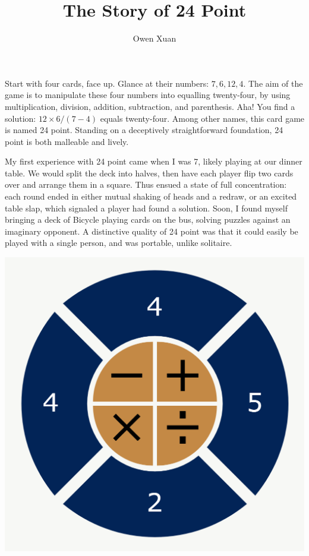 \documentclass{article}
\title{The Story of 24 Point}
\author{Owen Xuan}
\begin{document}
\maketitle
Start with four cards, face up. Glance at their numbers: $7, 6, 12, 4$. The aim of the game is to manipulate these four numbers into equalling twenty-four, by using multiplication, division, addition, subtraction, and parenthesis. Aha! You find a solution:  $12 \times 6 / (7-4)$ equals twenty-four. Among other names, this card game is named 24 point. Standing on a deceptively straightforward foundation, 24 point is both malleable and lively. 

My first experience with 24 point came when I was 7, likely playing at our dinner table. We would split the deck into halves, then have each player flip two cards over and arrange them in a square. Thus ensued a state of full concentration: each round ended in either mutual shaking of heads and a redraw, or an excited table slap, which signaled a player had found a solution. Soon, I found myself bringing a deck of Bicycle playing cards on the bus, solving puzzles against an imaginary opponent. A distinctive quality of 24 point was that it could easily be played with a single person, and was portable, unlike solitaire. 

\begin{center}
\includegraphics[scale=0.25]{images/24.png}
\end{center}
\end{document}
